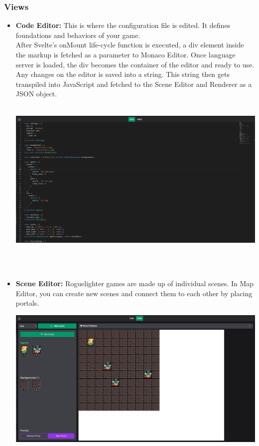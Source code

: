 \documentclass{article}
\begin{document}
\subsubsection{Views}
\begin{itemize}
    \item \textbf{Code Editor:} This is where the configuration file is edited. It defines foundations and behaviors of your game.\\

    After Svelte's onMount life-cycle function is executed, a div element inside the markup is fetched as a parameter to Monaco Editor. Once language server is loaded, the div becomes the container of the editor and ready to use. Any changes on the editor is saved into a string. This string then gets transpiled into JavaScript and fetched to the Scene Editor and Renderer as a JSON object.\\\\
    \begin{minipage}{\linewidth}
        \centering
        \includegraphics[width=1\textwidth]{code-editor.PNG}
    \end{minipage}\\\\

    \item \textbf{Scene Editor:} Roguelighter games are made up of individual scenes. In Map Editor, you can create new scenes and connect them to each other by placing portals.\\
    \begin{minipage}{\linewidth}
        \centering
        \includegraphics[width=1\textwidth]{scene-editor.PNG}
    \end{minipage}\\\\
    

\end{itemize}
\end{document}
